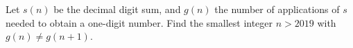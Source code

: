 Let $ s(n)$ be the decimal digit sum, and $ g(n)$ the number of applications of $ s $ needed to obtain a one-digit number. Find the smallest integer $ n>2019 $ with $ g(n)\ne g(n+1)$.
